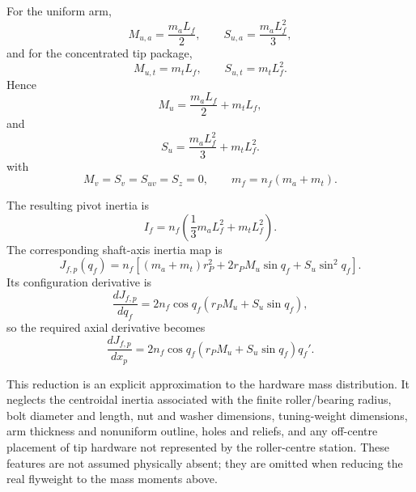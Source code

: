 \documentclass[11pt]{report}
\numberwithin{equation}{section}
\begin{document}
For the uniform arm,
\begin{equation}
    M_{u,a}=\frac{m_aL_f}{2},
    \qquad
    S_{u,a}=\frac{m_aL_f^2}{3},
\end{equation}
and for the concentrated tip package,
\begin{equation}
    M_{u,t}=m_tL_f,
    \qquad
    S_{u,t}=m_tL_f^2.
\end{equation}
Hence
\begin{equation}
    \boxed{
    M_u
    =
    \frac{m_aL_f}{2}+m_tL_f,
    }
    \label{eq:appB_Mu_simple}
\end{equation}
and
\begin{equation}
    \boxed{
    S_u
    =
    \frac{m_aL_f^2}{3}+m_tL_f^2.
    }
    \label{eq:appB_Su_simple}
\end{equation}
with
\begin{equation}
    M_v=S_v=S_{uv}=S_z=0,
    \qquad
    m_f=n_f(m_a+m_t).
\end{equation}

The resulting pivot inertia is
\begin{equation}
    \boxed{
    I_f
    =
    n_f
    \left(
        \frac{1}{3}m_aL_f^2+m_tL_f^2
    \right).
    }
    \label{eq:appB_If_simple}
\end{equation}
The corresponding shaft-axis inertia map is
\begin{equation}
    \boxed{
    J_{f,p}(q_f)
    =
    n_f
    \left[
        (m_a+m_t)r_P^2
        +2r_PM_u\sin q_f
        +S_u\sin^2q_f
    \right].
    }
    \label{eq:appB_J_simple}
\end{equation}
Its configuration derivative is
\begin{equation}
    \boxed{
    \frac{dJ_{f,p}}{dq_f}
    =
    2n_f\cos q_f
    \left(
        r_PM_u+S_u\sin q_f
    \right),
    }
    \label{eq:appB_dJ_dq_simple}
\end{equation}
so the required axial derivative becomes
\begin{equation}
    \boxed{
    \frac{dJ_{f,p}}{dx_p}
    =
    2n_f\cos q_f
    \left(
        r_PM_u+S_u\sin q_f
    \right)q_f'.
    }
    \label{eq:appB_dJ_dx_simple}
\end{equation}

This reduction is an explicit approximation to the hardware mass distribution.
It neglects the centroidal inertia associated with the finite roller/bearing
radius, bolt diameter and length, nut and washer dimensions, tuning-weight
dimensions, arm thickness and nonuniform outline, holes and reliefs, and any
off-centre placement of tip hardware not represented by the roller-centre
station. These features are not assumed physically absent; they are omitted
when reducing the real flyweight to the mass moments above.
\end{document}
